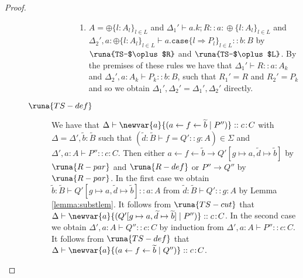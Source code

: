 \begin{theorem}
\begin{proof}
\begin{description}
\begin{description}
\begin{description}
\begin{enumerate}
    
    \item $A=\oplus\{l : A_l\}_{l\in L}$ and $\Delta_1'\vdash a.k; R :: a\!:\!\oplus\{l : A_l\}_{l\in L}$ and $\Delta_2',a : \oplus\{l : A_l\}_{l\in L}\vdash a.\texttt{case}\{l\Rightarrow P_l\}_{l\in L} :: b\!:\!B$ by $\runa{TS-$\oplus$R}$ and $\runa{TS-$\oplus$L}$. By the premises of these rules we have that $\Delta_1'\vdash R :: a\!:\!A_k$ and $\Delta_2',a : A_k\vdash P_k :: b\!:\!B$, such that $R_1'=R$ and $R_2'=P_k$ and so we obtain $\Delta_1',\Delta_2'=\Delta_1',\Delta_2'$ directly.
    
\end{enumerate}
    
    \end{description}
    
    
    
    \item[$\runa{TS-def}$] We have that $\Delta\vdash \newvar{a}{(a \leftarrow f \leftarrow \widetilde{b} \mid P'')} :: c\!:\!C$ with $\Delta=\Delta',\widetilde{b} : \widetilde{B}$ such that $(\widetilde{d} :\widetilde{B} \vdash f = Q' :: g\!:\!A) \in \Sigma$ and $\Delta',a:A\vdash P'' :: c\!:\!C$. Then either $a \leftarrow f \leftarrow \widetilde{b} \longrightarrow Q'[g\mapsto a, \widetilde{d}\mapsto\widetilde{b}]$ by $\runa{R-par}$ and $\runa{R-def}$ or $P''\longrightarrow Q''$ by $\runa{R-par}$. In the first case we obtain $\widetilde{b}:\widetilde{B}\vdash Q'[g\mapsto a, \widetilde{d}\mapsto\widetilde{b}] :: a\!:\!A$ from $\widetilde{d} :\widetilde{B} \vdash Q' :: g\!:\!A$ by Lemma \ref{lemma:substlem}. It follows from $\runa{TS-cut}$ that $\Delta\vdash \newvar{a}{(Q'[g\mapsto a, \widetilde{d}\mapsto\widetilde{b}] \mid P'')} :: c\!:\!C$. In the second case we obtain $\Delta',a:A\vdash Q'' :: c\!:\!C$ by induction from $\Delta',a:A\vdash P'' :: c\!:\!C$. It follows from $\runa{TS-def}$ that $\Delta\vdash \newvar{a}{(a \leftarrow f \leftarrow \widetilde{b} \mid Q'')} :: c\!:\!C$.
\end{description}


\end{description}
\end{proof}
\end{theorem}
